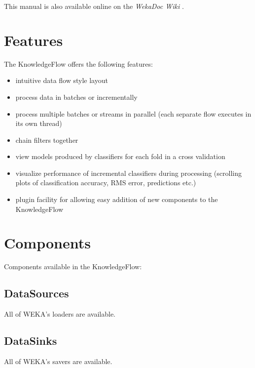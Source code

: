 \noindent This manual is also available online on the \textit{WekaDoc Wiki} \cite{wekadoc}.


\newpage
\section{Features}

The KnowledgeFlow offers the following features:
\begin{itemize}
	\item intuitive data flow style layout
	\item process data in batches or incrementally 
	\item process multiple batches or streams in parallel (each separate flow 
  	executes in its own thread)
	\item chain filters together
	\item view models produced by classifiers for each fold in a cross validation
	\item visualize performance of incremental classifiers during 
  	processing (scrolling plots of classification accuracy, RMS error, 
  	predictions etc.)
        \item plugin facility for allowing easy addition of new components
        to the KnowledgeFlow
\end{itemize}

\newpage
\section{Components}
Components available in the KnowledgeFlow:

\subsection{DataSources} All of WEKA's loaders are available.
\begin{center}
\end{center}

\subsection{DataSinks} All of WEKA's savers are available.
\begin{center}
\end{center}

